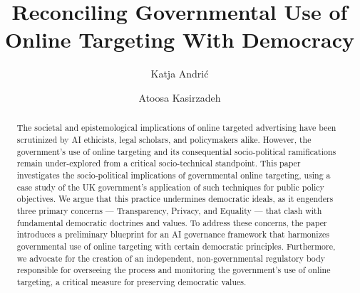 \documentclass[preprint]{acmart}
\begin{document}
\title{Reconciling Governmental Use of Online Targeting With Democracy}

\author{Katja Andrić}

\author{Atoosa Kasirzadeh}



\renewcommand{\shortauthors}{Andrić and Kasirzadeh}

\begin{abstract}
The societal and epistemological implications of online targeted advertising have been scrutinized by AI ethicists, legal scholars, and policymakers alike. However, the government's use of online targeting and its consequential socio-political ramifications remain under-explored from a critical socio-technical standpoint. This paper investigates the socio-political implications of governmental online targeting, using a case study of the UK government's application of such techniques for public policy objectives. We argue that this practice undermines democratic ideals, as it engenders three primary concerns --- Transparency, Privacy, and Equality --- that clash with fundamental democratic doctrines and values. To address these concerns, the paper introduces a preliminary blueprint for an AI governance framework that harmonizes governmental use of online targeting with certain democratic principles. Furthermore, we advocate for the creation of an independent, non-governmental regulatory body responsible for overseeing the process and monitoring the government's use of online targeting, a critical measure for preserving democratic values.\end{abstract}
\end{document}
